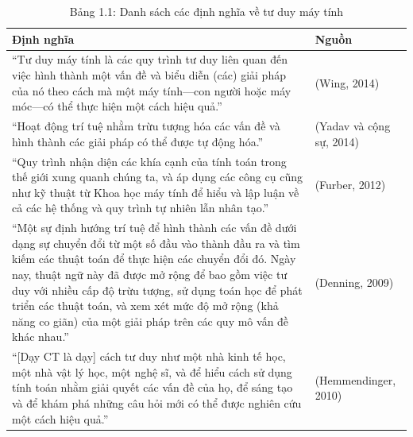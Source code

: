 \begin{table}[H]
\centering
\renewcommand{\arraystretch}{1.4}
\begin{tabular}{|p{10cm}|p{4cm}|}
\hline
\textbf{Định nghĩa} & \textbf{Nguồn} \\ \hline

``Tư duy máy tính là các quy trình tư duy liên quan đến việc hình thành một vấn đề và biểu diễn (các) giải pháp của nó theo cách mà một máy tính—con người hoặc máy móc—có thể thực hiện một cách hiệu quả.'' 
& (Wing, 2014) \\ \hline

``Hoạt động trí tuệ nhằm trừu tượng hóa các vấn đề và hình thành các giải pháp có thể được tự động hóa.'' 
& (Yadav và cộng sự, 2014) \\ \hline

``Quy trình nhận diện các khía cạnh của tính toán trong thế giới xung quanh chúng ta, và áp dụng các công cụ cũng như kỹ thuật từ Khoa học máy tính để hiểu và lập luận về cả các hệ thống và quy trình tự nhiên lẫn nhân tạo.'' 
& (Furber, 2012) \\ \hline

``Một sự định hướng trí tuệ để hình thành các vấn đề dưới dạng sự chuyển đổi từ một số đầu vào thành đầu ra và tìm kiếm các thuật toán để thực hiện các chuyển đổi đó. Ngày nay, thuật ngữ này đã được mở rộng để bao gồm việc tư duy với nhiều cấp độ trừu tượng, sử dụng toán học để phát triển các thuật toán, và xem xét mức độ mở rộng (khả năng co giãn) của một giải pháp trên các quy mô vấn đề khác nhau.'' 
& (Denning, 2009) \\ \hline

``[Dạy CT là dạy] cách tư duy như một nhà kinh tế học, một nhà vật lý học, một nghệ sĩ, và để hiểu cách sử dụng tính toán nhằm giải quyết các vấn đề của họ, để sáng tạo và để khám phá những câu hỏi mới có thể được nghiên cứu một cách hiệu quả.'' 
& (Hemmendinger, 2010) \\ \hline

\end{tabular}
\caption*{Bảng 1.1: Danh sách các định nghĩa về tư duy máy tính}
\end{table}

